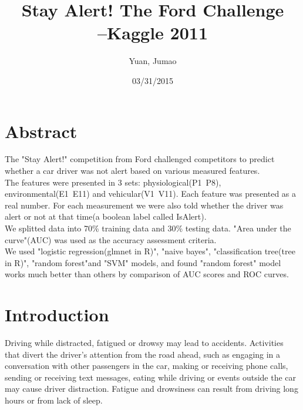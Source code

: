 \documentclass[11pt]{article}
\title{Stay Alert! The Ford Challenge\\
       \hfill --\small{Kaggle 2011}}
\author{Yuan, Jumao}
\date{03/31/2015}
\begin{document}
\begin{singlespacing}

\maketitle


\setlength\parindent{0pt} %
\singlespacing



\tableofcontents
\newpage
\doublespacing  %
\section{Abstract}
The "Stay Alert!" competition from Ford challenged competitors to predict whether a car driver was not alert based on various measured features.\\
The features were presented in 3 sets: physiological(P1~P8), environmental(E1~E11) and vehicular(V1~V11). Each feature was presented as a real number. For each measurement we were also told whether the driver was alert or not at that time(a boolean label called IsAlert).\\
We splitted data into 70\% training data and 30\% testing data. "Area under the curve"(AUC) was used as the accuracy assessment criteria. \\
We used "logistic regression(glmnet in R)", "naive bayes", "classification tree(tree in R)", "random forest"and "SVM" models, and found "random forest" model works much better than others by comparison of AUC scores and ROC curves.

\section{Introduction} %
Driving while distracted, fatigued or drowsy may lead to accidents. Activities that divert the driver's attention from the road ahead, such as engaging in a conversation with other passengers in the car, making or receiving phone calls, sending or receiving text messages, eating while driving or events outside the car may cause driver distraction. Fatigue and drowsiness can result from driving long hours or from lack of sleep.


\end{singlespacing}
\end{document}
